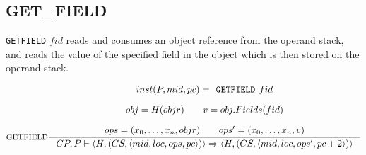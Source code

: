 \subsection{GET\_FIELD}
\texttt{GETFIELD} $fid$ reads and consumes an object reference from the operand stack, and reads the value of the specified field in the object which is then stored on the operand stack. 

$$\inference[GETFIELD]{
inst(P,mid, pc) = \texttt{GETFIELD }fid \semnl\\
obj = H(objr) \semsp
v = obj.Fields(fid)\semnl \\
ops = (x_0, \ldots, x_n, objr) \semsp ops' = (x_0, \ldots, x_n, v)}
{CP, P \vdash \langle H, (CS, \langle mid, loc, ops, pc \rangle )\rangle \Rightarrow \langle H, (CS, \langle mid, loc, ops', pc + 2 \rangle )\rangle}$$
